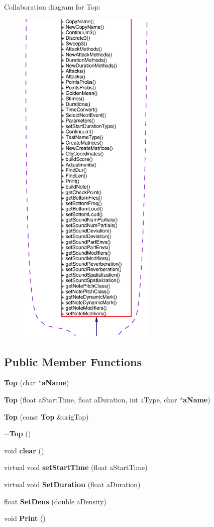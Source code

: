 Collaboration diagram for Top:\begin{figure}[H]
\begin{center}
\leavevmode
\includegraphics[width=186pt]{classTop__coll__graph}
\end{center}
\end{figure}
\subsection*{Public Member Functions}
\begin{CompactItemize}
\item 
{\bf Top} (char $\ast${\bf a\-Name})
\item 
{\bf Top} (float a\-Start\-Time, float a\-Duration, int a\-Type, char $\ast${\bf a\-Name})
\item 
{\bf Top} (const  {\bf Top} \&orig\-Top)
\item 
{\bf $\sim$Top} ()
\item 
void {\bf clear} ()
\item 
virtual void {\bf set\-Start\-Time} (float a\-Start\-Time)
\item 
virtual void {\bf Set\-Duration} (float a\-Duration)
\item 
float {\bf Set\-Dens} (double a\-Density)
\item 
void {\bf Print} ()
\end{CompactItemize}
